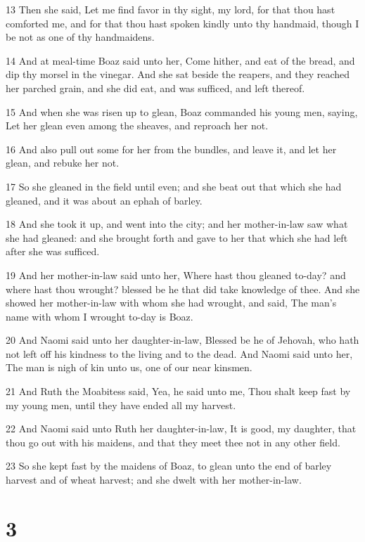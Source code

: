 \par 13 Then she said, Let me find favor in thy sight, my lord, for that thou hast comforted me, and for that thou hast spoken kindly unto thy handmaid, though I be not as one of thy handmaidens.
\par 14 And at meal-time Boaz said unto her, Come hither, and eat of the bread, and dip thy morsel in the vinegar. And she sat beside the reapers, and they reached her parched grain, and she did eat, and was sufficed, and left thereof.
\par 15 And when she was risen up to glean, Boaz commanded his young men, saying, Let her glean even among the sheaves, and reproach her not.
\par 16 And also pull out some for her from the bundles, and leave it, and let her glean, and rebuke her not.
\par 17 So she gleaned in the field until even; and she beat out that which she had gleaned, and it was about an ephah of barley.
\par 18 And she took it up, and went into the city; and her mother-in-law saw what she had gleaned: and she brought forth and gave to her that which she had left after she was sufficed.
\par 19 And her mother-in-law said unto her, Where hast thou gleaned to-day? and where hast thou wrought? blessed be he that did take knowledge of thee. And she showed her mother-in-law with whom she had wrought, and said, The man's name with whom I wrought to-day is Boaz.
\par 20 And Naomi said unto her daughter-in-law, Blessed be he of Jehovah, who hath not left off his kindness to the living and to the dead. And Naomi said unto her, The man is nigh of kin unto us, one of our near kinsmen.
\par 21 And Ruth the Moabitess said, Yea, he said unto me, Thou shalt keep fast by my young men, until they have ended all my harvest.
\par 22 And Naomi said unto Ruth her daughter-in-law, It is good, my daughter, that thou go out with his maidens, and that they meet thee not in any other field.
\par 23 So she kept fast by the maidens of Boaz, to glean unto the end of barley harvest and of wheat harvest; and she dwelt with her mother-in-law.

\chapter{3}

